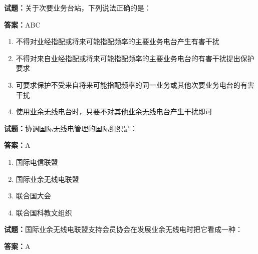 \documentclass{ctexbook}
\begin{document}




\vspace{1em}

\textbf{试题：}关于次要业务台站，下列说法正确的是： 

\textbf{答案：}ABC 

\begin{enumerate}[leftmargin=3em]
  \item 不得对业经指配或将来可能指配频率的主要业务电台产生有害干扰 

  \item 不得对来自业经指配或将来可能指配频率的主要业务电台的有害干扰提出保护要求 

  \item 可要求保护不受来自将来可能指配频率的同一业务或其他次要业务电台的有害干扰 

  \item 使用业余无线电台时，只要不对其他业余无线电台产生干扰即可 

\end{enumerate}





\vspace{1em}

\textbf{试题：}协调国际无线电管理的国际组织是： 

\textbf{答案：}A 

\begin{enumerate}[leftmargin=3em]
  \item 国际电信联盟 

  \item 国际业余无线电联盟 

  \item 联合国大会 

  \item 联合国科教文组织 

\end{enumerate}






\vspace{1em}

\textbf{试题：}国际业余无线电联盟支持会员协会在发展业余无线电时把它看成一种： 

\textbf{答案：}A 
\end{document}
